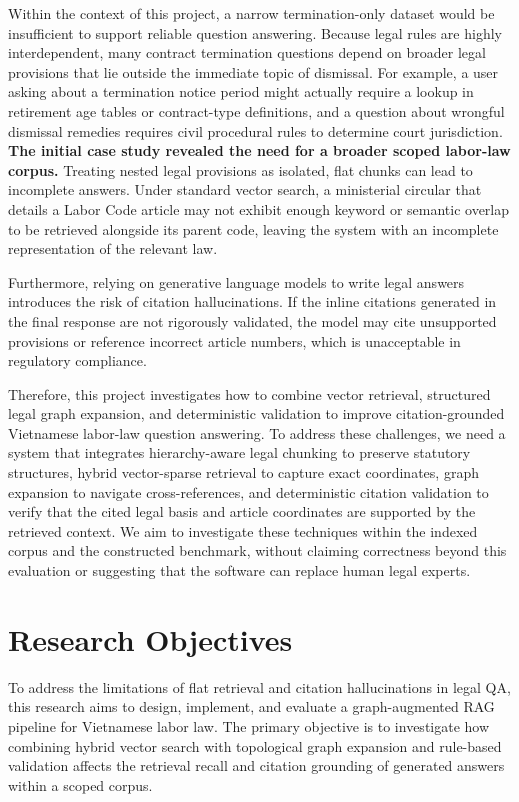 Within the context of this project, a narrow termination-only dataset would be insufficient to support reliable question answering. Because legal rules are highly interdependent, many contract termination questions depend on broader legal provisions that lie outside the immediate topic of dismissal. For example, a user asking about a termination notice period might actually require a lookup in retirement age tables or contract-type definitions, and a question about wrongful dismissal remedies requires civil procedural rules to determine court jurisdiction. \textbf{The initial case study revealed the need for a broader scoped labor-law corpus.} Treating nested legal provisions as isolated, flat chunks can lead to incomplete answers. Under standard vector search, a ministerial circular that details a Labor Code article may not exhibit enough keyword or semantic overlap to be retrieved alongside its parent code, leaving the system with an incomplete representation of the relevant law.

Furthermore, relying on generative language models to write legal answers introduces the risk of citation hallucinations. If the inline citations generated in the final response are not rigorously validated, the model may cite unsupported provisions or reference incorrect article numbers, which is unacceptable in regulatory compliance.

Therefore, this project investigates how to combine vector retrieval, structured legal graph expansion, and deterministic validation to improve citation-grounded Vietnamese labor-law question answering. To address these challenges, we need a system that integrates hierarchy-aware legal chunking to preserve statutory structures, hybrid vector-sparse retrieval to capture exact coordinates, graph expansion to navigate cross-references, and deterministic citation validation to verify that the cited legal basis and article coordinates are supported by the retrieved context. We aim to investigate these techniques within the indexed corpus and the constructed benchmark, without claiming correctness beyond this evaluation or suggesting that the software can replace human legal experts.

\section{Research Objectives}
To address the limitations of flat retrieval and citation hallucinations in legal QA, this research aims to design, implement, and evaluate a graph-augmented RAG pipeline for Vietnamese labor law. The primary objective is to investigate how combining hybrid vector search with topological graph expansion and rule-based validation affects the retrieval recall and citation grounding of generated answers within a scoped corpus.

